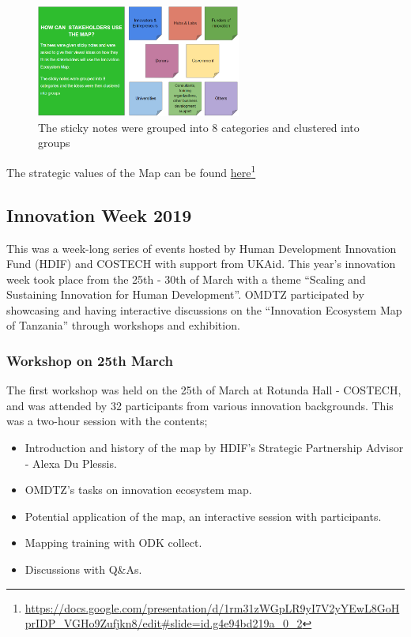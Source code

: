 \documentclass[a4paper,12pt,twoside]{article}
\begin{document}
\begin{figure}[h]
  \caption{The sticky notes were grouped into 8 categories and clustered into groups}
  \centering
  \includegraphics[width=0.6\textwidth]{Strategic_value_PPT.PNG}
\end{figure}

The strategic values of the Map can be found \href{https://docs.google.com/presentation/d/1rm31zWGpLR9yI7V2yYEwL8GoHprIDP_VGHo9Zufjkn8/edit#slide=id.g4e94bd219a_0_2}{here}\footnote{\url{https://docs.google.com/presentation/d/1rm31zWGpLR9yI7V2yYEwL8GoHprIDP_VGHo9Zufjkn8/edit#slide=id.g4e94bd219a_0_2}}

\subsection{Innovation Week 2019}
This was a week-long series of events hosted by Human Development Innovation Fund (HDIF) and COSTECH with support from UKAid. This year’s innovation week took place from the 25th - 30th of March with a theme “Scaling and Sustaining Innovation for Human Development”. OMDTZ participated by showcasing and having interactive discussions on the “Innovation Ecosystem Map of Tanzania” through workshops and exhibition. 

\subsubsection{Workshop on 25th March}
The first workshop was held on the 25th of March at Rotunda Hall - COSTECH, and was attended by 32 participants from various innovation backgrounds. This was a two-hour session with the contents; 

\begin{itemize}
    \item Introduction and history of the map by HDIF’s Strategic Partnership Advisor - Alexa Du Plessis.
    \item OMDTZ’s tasks on innovation ecosystem map.
    \item Potential application of the map, an interactive session with participants.
    \item Mapping training with ODK collect.
    \item Discussions with Q&As.
\end{itemize}
\end{document}
